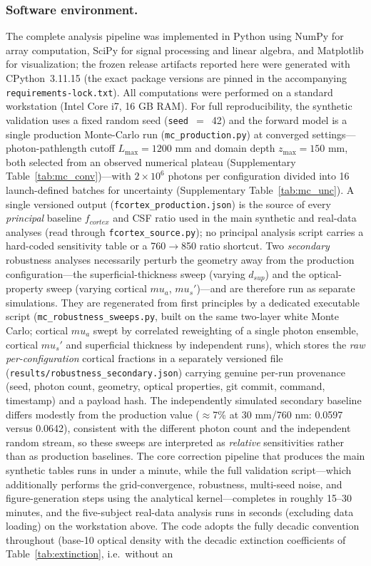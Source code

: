 \documentclass[11pt]{article}
\def\mu{mu}%
\def\mathrm#1{#1}%
\def\,{ }%
\begin{document}
\subsubsection{Software environment.}
The complete analysis pipeline was implemented in Python using NumPy for array computation, SciPy for signal processing and linear algebra, and Matplotlib for visualization; the frozen release artifacts reported here were generated with CPython~3.11.15 (the exact package versions are pinned in the accompanying \texttt{requirements-lock.txt}). All computations were performed on a standard workstation (Intel Core i7, 16\,GB RAM). For full reproducibility, the synthetic validation uses a fixed random seed (\texttt{seed}~$=$~42) and the forward model is a single production Monte-Carlo run (\texttt{mc\_production.py}) at converged settings---photon-pathlength cutoff $L_{\max}=1200$\,mm and domain depth $z_{\max}=150$\,mm, both selected from an observed numerical plateau (Supplementary Table~\ref{tab:mc_conv})---with $2\times10^{6}$ photons per configuration divided into 16 launch-defined batches for uncertainty (Supplementary Table~\ref{tab:mc_unc}). A single versioned output (\texttt{fcortex\_production.json}) is the source of every \emph{principal} baseline $f_{\mathrm{cortex}}$ and CSF ratio used in the main synthetic and real-data analyses (read through \texttt{fcortex\_source.py}); no principal analysis script carries a hard-coded sensitivity table or a 760$\to$850 ratio shortcut. Two \emph{secondary} robustness analyses necessarily perturb the geometry away from the production configuration---the superficial-thickness sweep (varying $d_{\mathrm{sup}}$) and the optical-property sweep (varying cortical $\mu_a$, $\mu_s'$)---and are therefore run as separate simulations. They are regenerated from first principles by a dedicated executable script (\texttt{mc\_robustness\_sweeps.py}, built on the same two-layer white Monte Carlo; cortical $\mu_a$ swept by correlated reweighting of a single photon ensemble, cortical $\mu_s'$ and superficial thickness by independent runs), which stores the \emph{raw per-configuration} cortical fractions in a separately versioned file (\texttt{results/robustness\_secondary.json}) carrying genuine per-run provenance (seed, photon count, geometry, optical properties, git commit, command, timestamp) and a payload hash. The independently simulated secondary baseline differs modestly from the production value ($\approx$7\% at 30\,mm/760\,nm: 0.0597 versus 0.0642), consistent with the different photon count and the independent random stream, so these sweeps are interpreted as \emph{relative} sensitivities rather than as production baselines. The core correction pipeline that produces the main synthetic tables runs in under a minute, while the full validation script---which additionally performs the grid-convergence, robustness, multi-seed noise, and figure-generation steps using the analytical kernel---completes in roughly 15--30 minutes, and the five-subject real-data analysis runs in seconds (excluding data loading) on the workstation above. The code adopts the fully decadic convention throughout (base-10 optical density with the decadic extinction coefficients of Table~\ref{tab:extinction}, i.e.\ without an 
\end{document}
